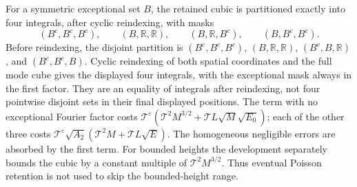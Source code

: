 \documentclass[11pt,a4paper,oneside]{article}
\theoremstyle{definition}
\newcommand{\R}{\mathbb R}
\newcommand{\eps}{\varepsilon}
\numberwithin{equation}{section}
\begin{document}
For a symmetric exceptional set $B$, the retained cubic is partitioned exactly
into four integrals, after cyclic reindexing, with masks
\[
 (B^c,B^c,B^c),\qquad(B,\R,\R),\qquad
 (B,\R,B^c),\qquad(B,B^c,B^c).
\]
Before reindexing, the disjoint partition is $(B^c,B^c,B^c)$, $(B,\R,\R)$, $(B^c,B,\R)$, and $(B^c,B^c,B)$. Cyclic reindexing of both spatial coordinates and the full mode cube gives the displayed four integrals, with the exceptional mask always in the first factor. They are an equality of integrals after reindexing, not four pointwise disjoint sets in their final displayed positions. The term with no exceptional Fourier factor costs
$\mathcal T^\eps(\mathcal T^2M^{3/2}+\mathcal TL\sqrt M\sqrt{E_0})$;
each of the other three costs
$\mathcal T^\eps\sqrt{A_2}(\mathcal T^2M+\mathcal TL\sqrt E)$.
The homogeneous negligible errors are absorbed by the first term.
For bounded heights the development separately bounds the cubic by a constant
multiple of $\mathcal T^2M^{3/2}$. Thus eventual Poisson retention is not
used to skip the bounded-height range.
\end{document}
